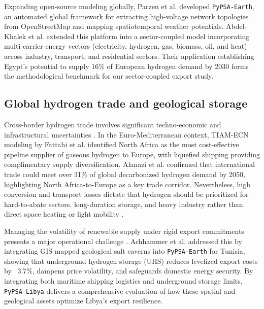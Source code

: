 \documentclass[preprint,12pt]{elsarticle}
\begin{document}
Expanding open-source modeling globally, Parzen et al. \cite{parzen2023pypsa} developed \texttt{PyPSA-Earth}, an automated global framework for extracting high-voltage network topologies from OpenStreetMap and mapping spatiotemporal weather potentials. Abdel-Khalek et al. \cite{abdelkhalek2025pypsa} extended this platform into a sector-coupled model incorporating multi-carrier energy vectors (electricity, hydrogen, gas, biomass, oil, and heat) across industry, transport, and residential sectors. Their application establishing Egypt's potential to supply 16\% of European hydrogen demand by 2030 forms the methodological benchmark for our sector-coupled export study.

\subsection{Global hydrogen trade and geological storage}
Cross-border hydrogen trade involves significant techno-economic and infrastructural uncertainties \cite{fakhreddine2025global}. In the Euro-Mediterranean context, TIAM-ECN modeling by Fattahi et al. \cite{fattahi2024opportunities} identified North Africa as the most cost-effective pipeline supplier of gaseous hydrogen to Europe, with liquefied shipping providing complimentary supply diversification. Alanazi et al. \cite{alanazi2025renewable} confirmed that international trade could meet over 31\% of global decarbonized hydrogen demand by 2050, highlighting North Africa-to-Europe as a key trade corridor. Nevertheless, high conversion and transport losses dictate that hydrogen should be prioritized for hard-to-abate sectors, long-duration storage, and heavy industry rather than direct space heating or light mobility \cite{johnson2025realistic}.

Managing the volatility of renewable supply under rigid export commitments presents a major operational challenge \cite{terlouw2022large}. Achhammer et al. \cite{achhammer2026impact} addressed this by integrating GIS-mapped geological salt caverns into \texttt{PyPSA-Earth} for Tunisia, showing that underground hydrogen storage (UHS) reduces levelized export costs by ~3.7\%, dampens price volatility, and safeguards domestic energy security. By integrating both maritime shipping logistics and underground storage limits, \texttt{PyPSA-Libya} delivers a comprehensive evaluation of how these spatial and geological assets optimize Libya's export resilience.

\end{document}
